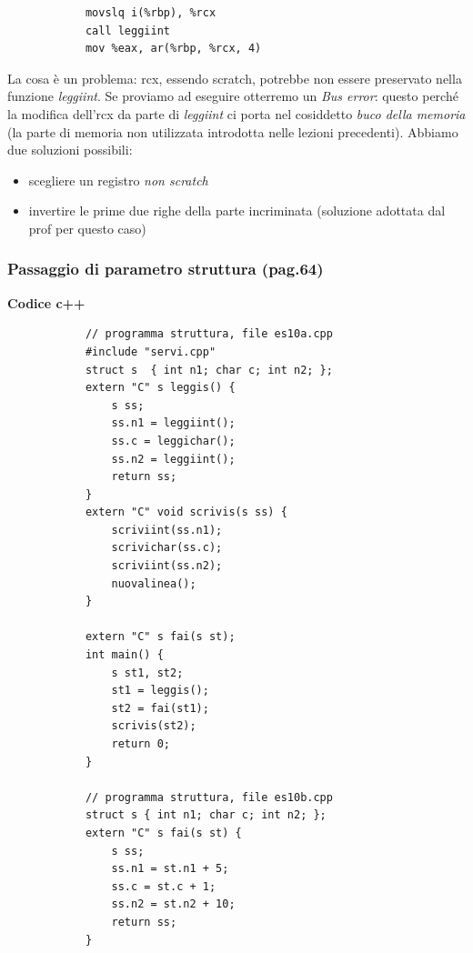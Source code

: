 \begin{itemize}
\begin{framed}
		\begin{verbatim}
			movslq i(%rbp), %rcx
			call leggiint
			mov %eax, ar(%rbp, %rcx, 4)
		\end{verbatim}
		La cosa è un problema: rcx, essendo scratch, potrebbe non essere preservato nella funzione \emph{leggiint}. Se proviamo ad eseguire otterremo un \emph{Bus error}: questo perché la modifica dell'rcx da parte di \emph{leggiint} ci porta nel cosiddetto \emph{buco della memoria} (la parte di memoria non utilizzata introdotta nelle lezioni precedenti). Abbiamo due soluzioni possibili:
		\begin{itemize}
			\item scegliere un registro \emph{non scratch}
			\item invertire le prime due righe della parte incriminata (soluzione adottata dal prof per questo caso)
		\end{itemize}
	\end{framed}
\end{itemize}

\subsubsection{Passaggio di parametro struttura (pag.64)}
\begin{framed}
	\noindent \textbf{Codice c++} 
	\begin{multicols}{2}
		\begin{verbatim}
			// programma struttura, file es10a.cpp
			#include "servi.cpp"
			struct s  { int n1; char c; int n2; };
			extern "C" s leggis() {
				s ss;
				ss.n1 = leggiint();
				ss.c = leggichar();
				ss.n2 = leggiint();
				return ss; 
			}
			extern "C" void scrivis(s ss) {
				scriviint(ss.n1);
				scrivichar(ss.c);
				scriviint(ss.n2);
				nuovalinea();
			}
			
			extern "C" s fai(s st);
			int main() {
				s st1, st2;
				st1 = leggis();
				st2 = fai(st1);
				scrivis(st2);
				return 0;
			}
			
			// programma struttura, file es10b.cpp
			struct s { int n1; char c; int n2; };
			extern "C" s fai(s st) {
				s ss;
				ss.n1 = st.n1 + 5;
				ss.c = st.c + 1;
				ss.n2 = st.n2 + 10;
				return ss;
			}
		\end{verbatim}
	\end{multicols}
\end{framed}

